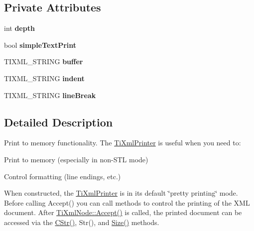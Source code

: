 \subsection*{\-Private \-Attributes}
\begin{DoxyCompactItemize}
\item 
\hypertarget{class_ti_xml_printer_a7e11330449daea912320c22f84387df7}{int {\bfseries depth}}\label{class_ti_xml_printer_a7e11330449daea912320c22f84387df7}

\item 
\hypertarget{class_ti_xml_printer_a2dceede5ae9bb8948f1ecaabb24ab2fb}{bool {\bfseries simple\-Text\-Print}}\label{class_ti_xml_printer_a2dceede5ae9bb8948f1ecaabb24ab2fb}

\item 
\hypertarget{class_ti_xml_printer_ae6cc56c79e52ef352ecc612809fdbedf}{\-T\-I\-X\-M\-L\-\_\-\-S\-T\-R\-I\-N\-G {\bfseries buffer}}\label{class_ti_xml_printer_ae6cc56c79e52ef352ecc612809fdbedf}

\item 
\hypertarget{class_ti_xml_printer_a672fda389bb3f5a2ae8ead867f9a2536}{\-T\-I\-X\-M\-L\-\_\-\-S\-T\-R\-I\-N\-G {\bfseries indent}}\label{class_ti_xml_printer_a672fda389bb3f5a2ae8ead867f9a2536}

\item 
\hypertarget{class_ti_xml_printer_a25e8120bcfda10cc06a11b2dedcef7fe}{\-T\-I\-X\-M\-L\-\_\-\-S\-T\-R\-I\-N\-G {\bfseries line\-Break}}\label{class_ti_xml_printer_a25e8120bcfda10cc06a11b2dedcef7fe}

\end{DoxyCompactItemize}


\subsection{\-Detailed \-Description}
\-Print to memory functionality. \-The \hyperlink{class_ti_xml_printer}{\-Ti\-Xml\-Printer} is useful when you need to\-:


\begin{DoxyEnumerate}
\item \-Print to memory (especially in non-\/\-S\-T\-L mode)
\item \-Control formatting (line endings, etc.)
\end{DoxyEnumerate}

\-When constructed, the \hyperlink{class_ti_xml_printer}{\-Ti\-Xml\-Printer} is in its default \char`\"{}pretty printing\char`\"{} mode. \-Before calling \-Accept() you can call methods to control the printing of the \-X\-M\-L document. \-After \hyperlink{class_ti_xml_node_acc0f88b7462c6cb73809d410a4f5bb86}{\-Ti\-Xml\-Node\-::\-Accept()} is called, the printed document can be accessed via the \hyperlink{class_ti_xml_printer_a859eede9597d3e0355b77757be48735e}{\-C\-Str()}, \-Str(), and \hyperlink{class_ti_xml_printer_ad01375ae9199bd2f48252eaddce3039d}{\-Size()} methods.

